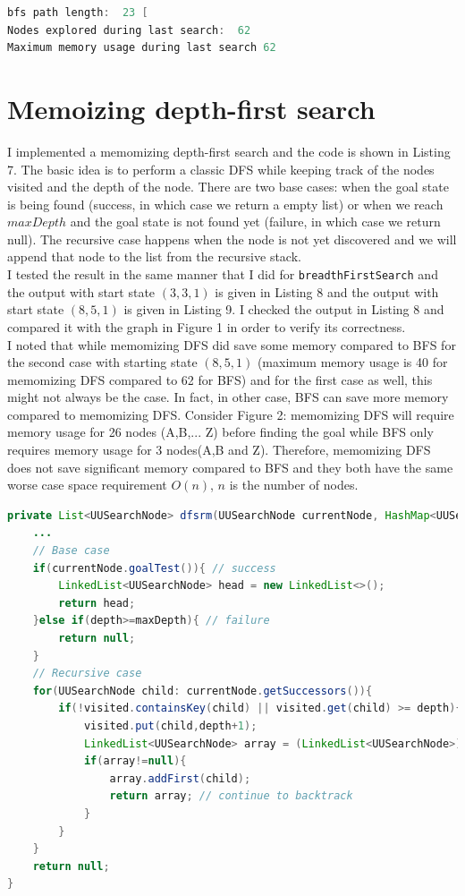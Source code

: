 \documentclass[9.5pt]{extarticle}
\begin{document}
\begin{lstlisting}[language=java,caption={Output for BFS for start state of (8, 5, 1)}]
bfs path length:  23 [
Nodes explored during last search:  62
Maximum memory usage during last search 62
\end{lstlisting}


\section{Memoizing depth-first search}

I implemented a memomizing depth-first search and the code is shown in Listing 7. The basic idea is to perform a classic DFS while keeping track of the nodes visited and the depth of the node. There are two base cases: when the goal state is being found (success, in which case we return a empty list) or when we reach $maxDepth$ and the goal state is not found yet (failure, in which case we return null). The recursive case happens when the node is not yet discovered and we will append that node to the list from the recursive stack. \\

I tested the result in the same manner that I did for \verb`breadthFirstSearch` and the output with start state $(3,3,1)$ is given in Listing 8 and the output with start state $(8,5,1)$ is given in Listing 9. I checked the output in Listing 8 and compared it with the graph in Figure 1 in order to verify its correctness.\\

I noted that while memomizing DFS did save some memory compared to BFS for the second case with starting state $(8,5,1)$ (maximum memory usage is 40 for memomizing DFS compared to 62 for BFS) and for the first case as well, this might not always be the case. In fact, in other case, BFS can save more memory compared to memomizing DFS. Consider Figure 2: memomizing DFS will require memory usage for 26 nodes (A,B,... Z) before finding the goal while BFS only requires memory usage for 3 nodes(A,B and Z). Therefore, memomizing DFS does not save significant memory compared to BFS and they both have the same worse case space requirement $O(n)$, $n$ is the number of nodes.

\begin{lstlisting}[language=java,caption={Memomizing depth first search}]
private List<UUSearchNode> dfsrm(UUSearchNode currentNode, HashMap<UUSearchNode,Integer> visited, int depth, int maxDepth) {
	...
	// Base case
	if(currentNode.goalTest()){	// success
		LinkedList<UUSearchNode> head = new LinkedList<>();
		return head;
	}else if(depth>=maxDepth){ // failure
		return null;
	}
	// Recursive case
	for(UUSearchNode child: currentNode.getSuccessors()){
		if(!visited.containsKey(child) || visited.get(child) >= depth){
			visited.put(child,depth+1);
			LinkedList<UUSearchNode> array = (LinkedList<UUSearchNode>) dfsrm(child, visited,depth+1,maxDepth); // recursion
			if(array!=null){ 
				array.addFirst(child);
				return array; // continue to backtrack
			}
		}
	}
	return null;
}
\end{lstlisting}
\end{document}
